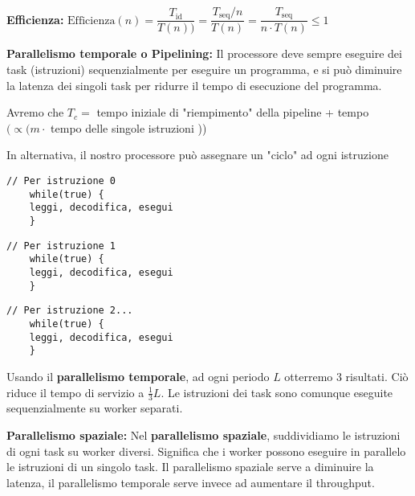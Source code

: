 \begin{defn}
	\textbf{Efficienza:}
	$ \text{Efficienza}(n) = \dfrac{T_{\text{id}}}{T(n))} = \dfrac{T_{\text{seq}}/n}{T(n)} = \dfrac{T_{\text{seq}}}{n \cdot T(n)} \leq 1 $
\end{defn}


\begin{defn}
	\textbf{Parallelismo temporale o Pipelining:} Il processore deve sempre eseguire dei task (istruzioni) sequenzialmente per eseguire un programma, e si può diminuire la latenza dei singoli task per ridurre il tempo di esecuzione del programma.
	
	
	Avremo che $ T_c = $ tempo iniziale di "riempimento" della pipeline + tempo $ ( \propto ( m \cdot $ tempo delle singole istruzioni )) 
	
	In alternativa, il nostro processore può assegnare un "ciclo" ad ogni istruzione
	
	\begin{lstlisting}[frame=single]
	// Per istruzione 0
	while(true) {
	leggi, decodifica, esegui
	}
	\end{lstlisting} 
	\begin{lstlisting}[frame=single]
	// Per istruzione 1
	while(true) {
	leggi, decodifica, esegui
	}
	\end{lstlisting} 
	\begin{lstlisting}[frame=single]
	// Per istruzione 2...
	while(true) {
	leggi, decodifica, esegui
	}
	\end{lstlisting} 
	
	
	Usando il \textbf{parallelismo temporale}, ad ogni periodo $ L $ otterremo 3 risultati. Ciò riduce il tempo di servizio a $ \frac{1}{3}L $. Le istruzioni dei task sono comunque eseguite sequenzialmente su worker separati.	
\end{defn}



\begin{defn}
	\textbf{Parallelismo spaziale:}
	Nel \textbf{parallelismo spaziale}, suddividiamo le istruzioni di ogni task su worker diversi. Significa che i worker possono eseguire in parallelo le istruzioni di un singolo task. Il parallelismo spaziale serve a diminuire la latenza, il parallelismo temporale serve invece ad aumentare il throughput.
	
\end{defn}

